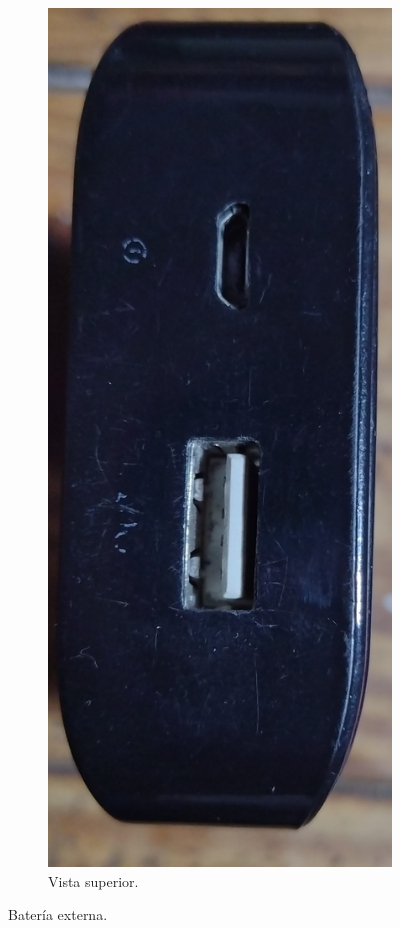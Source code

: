 \documentclass[11pt,a4paper]{article}
\begin{document}
\begin{figure}[h!]
\begin{subfigure}{0.2\textwidth}
			\includegraphics[width=\textwidth]{imagenes/battery_pack3.jpg}
			\caption{Vista superior.}
		\end{subfigure}
		\caption{Batería externa.}
		\label{fig:bateria_externa}
	\end{figure}
	
\end{document}
